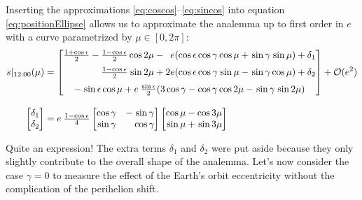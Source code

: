 \documentclass[12pt]{article}
\newcommand{\Sin}{%
  \mathop{\sbox0{$\cos$}\makebox[\wd0][r]{$\sin$}}%
}
\begin{document}
Inserting the approximations \eqref{eq:coscos}--\eqref{eq:sincos} into
equation \eqref{eq:positionEllipse} allows us to approximate the analemma 
up to first order in $e$ with a curve parametrized by $\mu \in [0,2\pi]$:
\begin{align}
    s\vert_{12:00}(\mu) &=
    \begin{bmatrix}
        \frac{1+\cos\epsilon}{2}-\frac{1-\cos\epsilon}{2} \cos2\mu
            -\phantom{2}e(\cos\epsilon\cos\gamma\cos\mu + \Sin\gamma\Sin\mu) 
            + \delta_1\\[6pt]
        \phantom{\frac{1+\cos\epsilon}{2}-{}}\frac{1-\cos\epsilon}{2} \Sin2\mu
            + 2e (\cos\epsilon\cos\gamma \Sin\mu - \Sin\gamma \cos\mu) 
            + \delta_2\\[6pt]
        -\Sin\epsilon \cos\mu + e\:\tfrac{\sin\epsilon}{2}(
            3\cos\gamma-\cos\gamma\cos2\mu-\Sin\gamma\Sin2\mu
        )
    \end{bmatrix}
    +\mathcal{O}(e^2)\\[9pt]
    \begin{bmatrix}
        \delta_1\\
        \delta_2
    \end{bmatrix} &=
    e\:\tfrac{1-\cos\epsilon}{4}
    \begin{bmatrix}
        \cos\gamma & -\Sin\gamma\\
        \Sin\gamma & \phantom{-}\cos\gamma
    \end{bmatrix}
    \begin{bmatrix}
        \cos\mu - \cos3\mu\\
        \Sin\mu + \Sin3\mu
    \end{bmatrix}%
\end{align}

Quite an expression! The extra terms $\delta_1$ and $\delta_2$ were put aside
because they only slightly contribute to the overall shape of the analemma.
Let's now consider the case $\gamma=0$ to measure the effect of the
Earth's orbit eccentricity without the complication of the perihelion shift.
\end{document}

